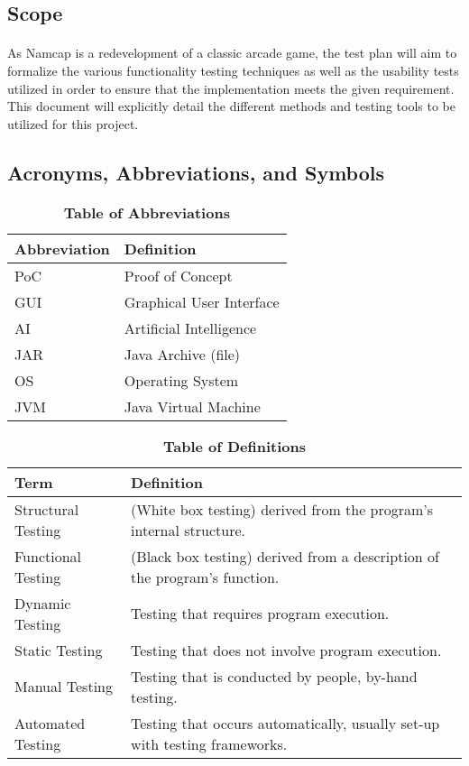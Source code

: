 \documentclass[12pt, titlepage]{article}
\begin{document}
\subsection{Scope}
\paragraph{}
As Namcap is a redevelopment of a classic arcade game, the test plan will aim to formalize the various functionality testing techniques as well as the usability tests utilized in order to ensure that the implementation meets the given requirement. This document will explicitly detail the different methods and testing tools to be utilized for this project.

\subsection{Acronyms, Abbreviations, and Symbols}
	
\begin{table}[hbp]
\caption{\textbf{Table of Abbreviations}} \label{Table}

\begin{tabularx}{\textwidth}{p{3cm}X}
\toprule
\textbf{Abbreviation} & \textbf{Definition} \\
\midrule
PoC & Proof of Concept\\
GUI & Graphical User Interface\\
AI & Artificial Intelligence\\
JAR & Java Archive (file)\\
OS & Operating System\\
JVM & Java Virtual Machine\\
\bottomrule
\end{tabularx}

\end{table}

\begin{table}[!htbp]
\caption{\textbf{Table of Definitions}} \label{Table}

\begin{tabularx}{\textwidth}{p{3cm}X}
\toprule
\textbf{Term} & \textbf{Definition}\\
\midrule
Structural Testing & (White box testing) derived from the program's internal structure.\\
Functional Testing & (Black box testing) derived from a description of the program's function.\\
Dynamic Testing & Testing that requires program execution.\\
Static Testing & Testing that does not involve program execution.\\
Manual Testing & Testing that is conducted by people, by-hand testing.\\
Automated Testing & Testing that occurs automatically, usually set-up with testing frameworks.\\
\bottomrule
\end{tabularx}

\end{table}	
\end{document}
